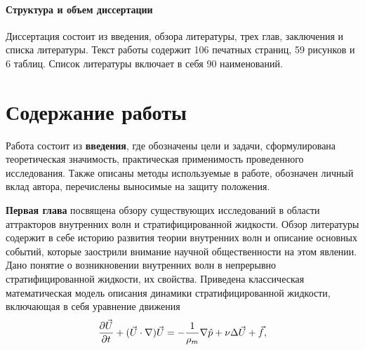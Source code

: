 \documentclass[utf8x]{G7-32} %
\begin{document}
\paragraph{Структура и объем диссертации}

Диссертация состоит из введения, обзора литературы, трех глав, заключения и списка литературы. Текст работы содержит 106 печатных страниц, 59 рисунков и 6 таблиц. Список литературы включает в себя 90 наименований. 


















































\renewcommand\thefigure{\arabic{figure}}

\section*{Содержание работы}

Работа состоит из \textbf{введения}, где обозначены цели и задачи, сформулирована теоретическая значимость, практическая применимость проведенного исследования.  Также описаны методы используемые в работе, обозначен личный вклад автора, перечислены выносимые на защиту положения.

\textbf{Первая глава} посвящена обзору существующих исследований в области аттракторов внутренних волн и стратифицированной жидкости. Обзор литературы содержит в себе историю развития теории внутренних волн и описание основных событий, которые заострили внимание научной общественности на этом явлении. Дано понятие о возникновении внутренних волн в непрерывно стратифицированной жидкости, их свойства. Приведена классическая математическая модель описания динамики стратифицированной жидкости, включающая в себя уравнение движения
\begin{equation*}
 \large \frac{\partial \vec U}{\partial t} + (\vec U \cdot \nabla) \vec U = - \frac{1}{\rho_m} \nabla \hat p + \nu \Delta \vec U  + \vec f,
 \label{eq:momClassic}
\end{equation*}
\end{document}
